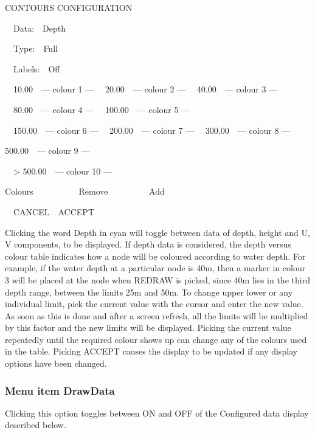 \documentclass{article}
\begin{document}
CONTOURS CONFIGURATION

\ \ Data:\ \ Depth

\ \ Type:\ \ Full

\ \ Labels:\ \ Off \newline


\ \ 10.00\ \ {}--- colour 1 ---\newline
\ \ 20.00\ \ {}--- colour 2 ---\newline
\ \ 40.00\ \ {}--- colour 3 ---

\ \ 80.00\ \ {}--- colour 4 ---\newline
\ \ 100.00\ \ {}--- colour 5 ---

\ \ 150.00\ \ {}--- colour 6 ---\newline
\ \ 200.00\ \ {}--- colour 7 ---\newline
\ \ 300.00\ \ {}--- colour 8 ---

500.00\ \ {}--- colour 9 ---

\ \ {\textgreater} 500.00\ \ {}--- colour 10 ---


\bigskip


\bigskip

Colours \ \ \ \ \ \ \ \ \ \ Remove \ \ \ \ \ \ \ \ \ Add


\bigskip

\ \ CANCEL\ \ ACCEPT


\bigskip

Clicking the word Depth in cyan will toggle between data of depth, height and U, V components, to be displayed. If depth data is considered, the depth versus colour table indicates how a node will be coloured according to water depth. For example, if the water depth at a particular node is 40m, then a marker in colour 3 will be placed at the node when REDRAW is picked, since 40m lies in the third depth range, between the limits 25m and 50m. To change upper lower or any individual limit, pick the current value with the cursor and enter the new value. As soon as this is done and after a screen refresh, all the limits will be multiplied by this factor and the new limits will be displayed. Picking the current value repeatedly until the required colour shows up can change any of the colours used in the table. Picking ACCEPT causes the display to be updated if any display options have been changed.

\subsubsection[Menu item DrawData]{Menu item DrawData}
Clicking this option toggles between ON and OFF of the Configured data display described below.
\end{document}
